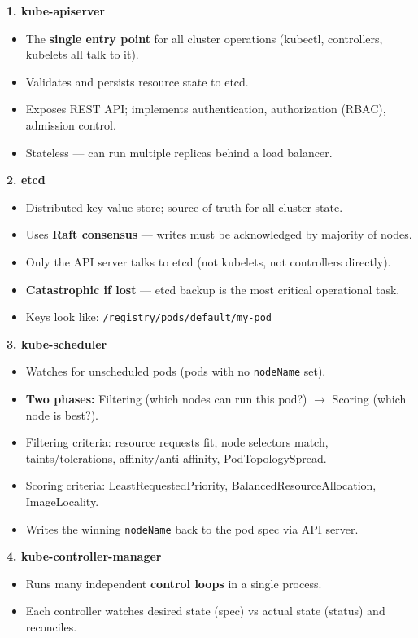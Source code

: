 \documentclass[11pt]{article}
\providecommand{\tightlist}{\setlength{\itemsep}{1pt}\setlength{\parskip}{0pt}}
\begin{document}
\textbf{1. kube-apiserver}

\begin{itemize}
\tightlist
\item
  The \textbf{single entry point} for all cluster operations (kubectl, controllers, kubelets all talk to it).
\item
  Validates and persists resource state to etcd.
\item
  Exposes REST API; implements authentication, authorization (RBAC), admission control.
\item
  Stateless --- can run multiple replicas behind a load balancer.
\end{itemize}

\textbf{2. etcd}

\begin{itemize}
\tightlist
\item
  Distributed key-value store; source of truth for all cluster state.
\item
  Uses \textbf{Raft consensus} --- writes must be acknowledged by majority of nodes.
\item
  Only the API server talks to etcd (not kubelets, not controllers directly).
\item
  \textbf{Catastrophic if lost} --- etcd backup is the most critical operational task.
\item
  Keys look like: \texttt{/registry/pods/default/my-pod}
\end{itemize}

\textbf{3. kube-scheduler}

\begin{itemize}
\tightlist
\item
  Watches for unscheduled pods (pods with no \texttt{nodeName} set).
\item
  \textbf{Two phases:} Filtering (which nodes can run this pod?) \(\rightarrow\) Scoring (which node is best?).
\item
  Filtering criteria: resource requests fit, node selectors match, taints/tolerations, affinity/anti-affinity, PodTopologySpread.
\item
  Scoring criteria: LeastRequestedPriority, BalancedResourceAllocation, ImageLocality.
\item
  Writes the winning \texttt{nodeName} back to the pod spec via API server.
\end{itemize}

\textbf{4. kube-controller-manager}

\begin{itemize}
\tightlist
\item
  Runs many independent \textbf{control loops} in a single process.
\item
  Each controller watches desired state (spec) vs actual state (status) and reconciles.
\end{itemize}
\end{document}
